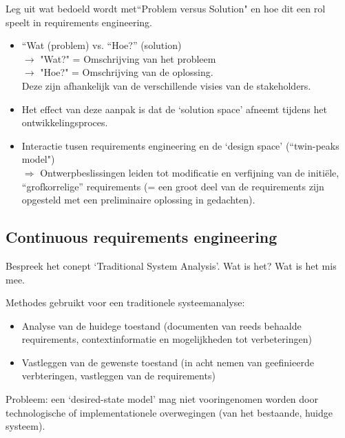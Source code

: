 \documentclass{article}
\begin{document}
\begin{quest}{}Leg uit wat bedoeld wordt met``Problem versus Solution" en hoe dit een rol speelt in requirements engineering.
\end{quest}

\begin{itemize}
    \item ``Wat (problem) vs. ``Hoe?” (solution) \\
    $\rightarrow$ "Wat?" =  Omschrijving van het probleem\\
     $\rightarrow$ "Hoe?" = Omschrijving van de oplossing. \\
     Deze zijn afhankelijk van de verschillende visies van de stakeholders.
    \item Het effect van deze aanpak is dat de `solution space' afneemt tijdens het ontwikkelingsproces.
    \item Interactie tusen requirements engineering en de `design space' (``twin-peaks model")\\
    $\Rightarrow$ Ontwerpbeslissingen leiden tot modificatie en verfijning van de initiële, ``grofkorrelige'' requirements (= een groot deel van de requirements zijn opgesteld met een preliminaire oplossing in gedachten).
\end{itemize}

\subsection{Continuous requirements engineering}

\begin{quest}{}
Bespreek het conept `Traditional System Analysis'. Wat is het? Wat is het mis mee.
\end{quest}
Methodes gebruikt voor een traditionele systeemanalyse:
\begin{itemize}
	\item Analyse van de huidege toestand (documenten van reeds behaalde requirements, contextinformatie en mogelijkheden tot verbeteringen)
	\item Vastleggen van de gewenste toestand (in acht nemen van geefinieerde verbteringen, vastleggen van de requirements)
\end{itemize}
Probleem: een `desired-state model' mag niet vooringenomen worden door technologische of implementationele overwegingen (van het bestaande, huidge systeem). 
\end{document}
